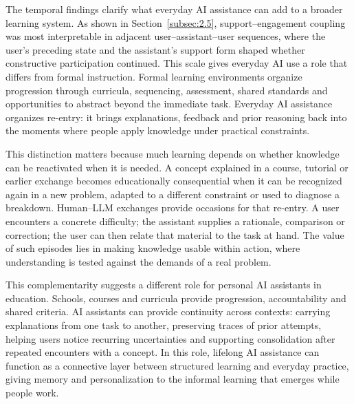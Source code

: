 The temporal findings clarify what everyday AI assistance can add to a broader learning system. As shown in Section~\ref{subsec:2.5}, support--engagement coupling was most interpretable in adjacent user--assistant--user sequences, where the user's preceding state and the assistant's support form shaped whether constructive participation continued. This scale gives everyday AI use a role that differs from formal instruction. Formal learning environments organize progression through curricula, sequencing, assessment, shared standards and opportunities to abstract beyond the immediate task. Everyday AI assistance organizes re-entry: it brings explanations, feedback and prior reasoning back into the moments where people apply knowledge under practical constraints.

This distinction matters because much learning depends on whether knowledge can be reactivated when it is needed. A concept explained in a course, tutorial or earlier exchange becomes educationally consequential when it can be recognized again in a new problem, adapted to a different constraint or used to diagnose a breakdown. Human--LLM exchanges provide occasions for that re-entry. A user encounters a concrete difficulty; the assistant supplies a rationale, comparison or correction; the user can then relate that material to the task at hand. The value of such episodes lies in making knowledge usable within action, where understanding is tested against the demands of a real problem.

This complementarity suggests a different role for personal AI assistants in education. Schools, courses and curricula provide progression, accountability and shared criteria. AI assistants can provide continuity across contexts: carrying explanations from one task to another, preserving traces of prior attempts, helping users notice recurring uncertainties and supporting consolidation after repeated encounters with a concept. In this role, lifelong AI assistance can function as a connective layer between structured learning and everyday practice, giving memory and personalization to the informal learning that emerges while people work.










